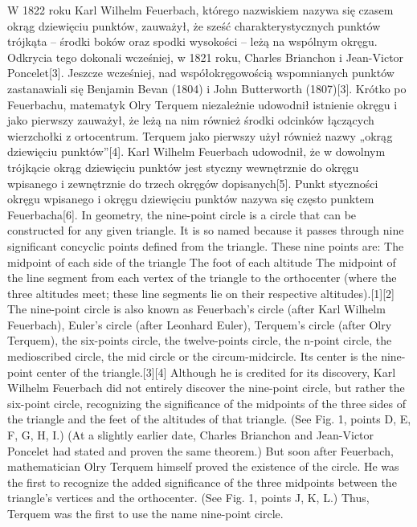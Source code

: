 W 1822 roku Karl Wilhelm Feuerbach, którego nazwiskiem nazywa się czasem okrąg dziewięciu punktów, zauważył, że sześć charakterystycznych punktów trójkąta – środki boków oraz spodki wysokości – leżą na wspólnym okręgu. Odkrycia tego dokonali wcześniej, w 1821 roku, Charles Brianchon i Jean-Victor Poncelet[3]. Jeszcze wcześniej, nad współokręgowością wspomnianych punktów zastanawiali się Benjamin Bevan (1804) i John Butterworth (1807)[3].
Krótko po Feuerbachu, matematyk Olry Terquem niezależnie udowodnił istnienie okręgu i jako pierwszy zauważył, że leżą na nim również środki odcinków łączących wierzchołki z ortocentrum. Terquem jako pierwszy użył również nazwy „okrąg dziewięciu punktów”[4].
Karl Wilhelm Feuerbach udowodnił, że w dowolnym trójkącie okrąg dziewięciu punktów jest styczny wewnętrznie do okręgu wpisanego i zewnętrznie do trzech okręgów dopisanych[5]. Punkt styczności okręgu wpisanego i okręgu dziewięciu punktów nazywa się często punktem Feuerbacha[6].
In geometry, the nine-point circle is a circle that can be constructed for any given triangle. It is so named because it passes through nine significant concyclic points defined from the triangle. These nine points are:
The midpoint of each side of the triangle
The foot of each altitude
The midpoint of the line segment from each vertex of the triangle to the orthocenter (where the three altitudes meet; these line segments lie on their respective altitudes).[1][2]
The nine-point circle is also known as Feuerbach's circle (after Karl Wilhelm Feuerbach), Euler's circle (after Leonhard Euler), Terquem's circle (after Olry Terquem), the six-points circle, the twelve-points circle, the n-point circle, the medioscribed circle, the mid circle or the circum-midcircle. Its center is the nine-point center of the triangle.[3][4]
Although he is credited for its discovery, Karl Wilhelm Feuerbach did not entirely discover the nine-point circle, but rather the six-point circle, recognizing the significance of the midpoints of the three sides of the triangle and the feet of the altitudes of that triangle. (See Fig. 1, points D, E, F, G, H, I.) (At a slightly earlier date, Charles Brianchon and Jean-Victor Poncelet had stated and proven the same theorem.) But soon after Feuerbach, mathematician Olry Terquem himself proved the existence of the circle. He was the first to recognize the added significance of the three midpoints between the triangle's vertices and the orthocenter. (See Fig. 1, points J, K, L.) Thus, Terquem was the first to use the name nine-point circle.
